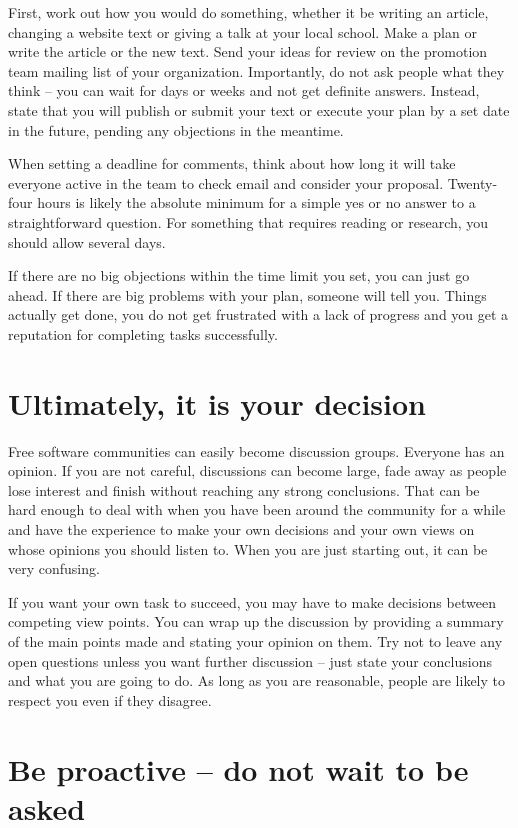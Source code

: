 First, work out how you would do something, whether it be writing an article, changing a website text or giving a talk at your local school. Make a plan or write the article or the new text. Send your ideas for review on the promotion team mailing list of your organization. Importantly, do not ask people what they think -- you can wait for days or weeks and not get definite answers. Instead, state that you will publish or submit your text or execute your plan by a set date in the future, pending any objections in the meantime.

When setting a deadline for comments, think about how long it will take everyone active in the team to check email and consider your proposal. Twenty-four hours is likely the absolute minimum for a simple yes or no answer to a straightforward question. For something that requires reading or research, you should allow several days.

If there are no big objections within the time limit you set, you can just go ahead. If there are big problems with your plan, someone will tell you. Things actually get done, you do not get frustrated with a lack of progress and you get a reputation for completing tasks successfully.

\section*{Ultimately, it is your decision}

Free software communities can easily become discussion groups. Everyone has an opinion. If you are not careful, discussions can become large, fade away as people lose interest and finish without reaching any strong conclusions. That can be hard enough to deal with when you have been around the community for a while and have the experience to make your own decisions and your own views on whose opinions you should listen to. When you are just starting out, it can be very confusing.

If you want your own task to succeed, you may have to make decisions between competing view points. You can wrap up the discussion by providing a summary of the main points made and stating your opinion on them. Try not to leave any open questions unless you want further discussion -- just state your conclusions and what you are going to do. As long as you are reasonable, people are likely to respect you even if they disagree.

\section*{Be proactive -- do not wait to be asked}

